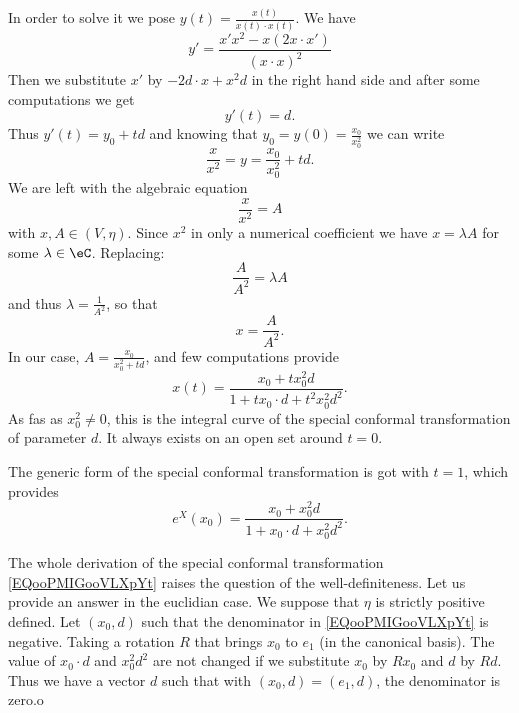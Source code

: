 \begin{description}
    In order to solve it we pose \( y(t)=\frac{ x(t) }{ x(t)\cdot x(t) }\). We have
    \begin{equation}
        y'=\frac{ x'x^2-x(2x\cdot x') }{ (x\cdot x)^2 }
    \end{equation}
    Then we substitute \( x'\) by \( -2d\cdot x+x^2d\) in the right hand side and after some computations we get
    \begin{equation}
        y'(t)=d.
    \end{equation}
    Thus \( y'(t)=y_{0}+td\) and knowing that \( y_0=y(0)=\frac{ x_0 }{ x_0^2 }\) we can write
    \begin{equation}
        \frac{ x }{ x^2 }=y=\frac{ x_0 }{ x_0^2 }+td.
    \end{equation}
    We are left with the algebraic equation
    \begin{equation}
        \frac{ x }{ x^2 }=A
    \end{equation}
    with \( x,A\in(V,\eta)\). Since \( x^2\) in only a numerical coefficient we have \( x=\lambda A\) for some \( \lambda\in \eC\). Replacing:
    \begin{equation}
        \frac{ A }{ A^2 }=\lambda A
    \end{equation}
    and thus \( \lambda=\frac{1}{ A^2 }\), so that
    \begin{equation}
        x=\frac{ A }{ A^2 }.
    \end{equation}
    In our case, \( A=\frac{ x_0 }{ x_0^2+td }\), and few computations provide
    \begin{equation}
        x(t)=\frac{ x_0+tx_0^2d }{ 1+tx_0\cdot d+t^2x_0^2d^2 }.
    \end{equation}
    As fas as \( x_0^2\neq 0\), this is the integral curve of the special conformal transformation of parameter \( d\). It always exists on an open set around \( t=0\).

    The generic form of the special conformal transformation is got with \( t=1\), which provides
    \begin{equation}        \label{EQooPMIGooVLXpYt}
        e^{X}(x_0)=\frac{ x_0+x_0^2d }{ 1+x_0\cdot d+x_0^2d^2 }.
    \end{equation}
\end{description}

The whole derivation of the special conformal transformation \eqref{EQooPMIGooVLXpYt} raises the question of the well-definiteness. Let us provide an answer in the euclidian case. We suppose that \( \eta\) is strictly positive defined. Let \( (x_0,d)\) such that the denominator in \eqref{EQooPMIGooVLXpYt} is negative. Taking a rotation \( R\) that brings \( x_0\) to \( e_1\) (in the canonical basis). The value of \( x_0\cdot d\) and \( x_0^2d^2 \) are not changed if we substitute \( x_0\) by \( Rx_0\) and \( d\) by \( Rd\). Thus we have a vector \( d\) such that with \( (x_0,d)=(e_1,d)\), the denominator is zero.o

